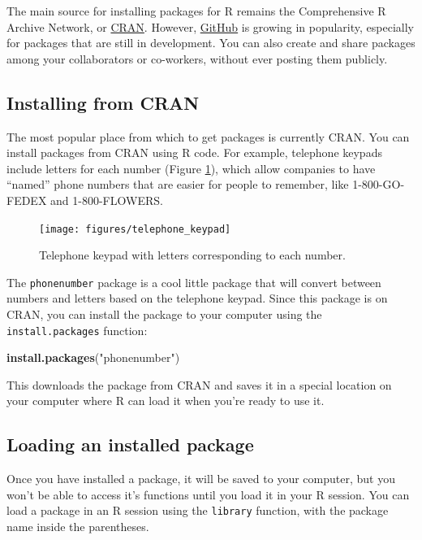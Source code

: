 \documentclass[]{book}
\makeatletter
\newenvironment{Shaded}{\begin{snugshade}}{\end{snugshade}}
\newcommand{\KeywordTok}[1]{\textcolor[rgb]{0.13,0.29,0.53}{\textbf{#1}}}
\newcommand{\StringTok}[1]{\textcolor[rgb]{0.31,0.60,0.02}{#1}}
\newcommand{\NormalTok}[1]{#1}
\newenvironment{kframe}{%
\medskip{}
\setlength{\fboxsep}{.8em}
 \def\at@end@of@kframe{}%
 \ifinner\ifhmode%
  \def\at@end@of@kframe{\end{minipage}}%
  \begin{minipage}{\columnwidth}%
 \fi\fi%
 \def\FrameCommand##1{\hskip\@totalleftmargin \hskip-\fboxsep
 \colorbox{shadecolor}{##1}\hskip-\fboxsep
     \hskip-\linewidth \hskip-\@totalleftmargin \hskip\columnwidth}%
 \MakeFramed {\advance\hsize-\width
   \@totalleftmargin\z@ \linewidth\hsize
   \@setminipage}}%
 {\par\unskip\endMakeFramed%
 \at@end@of@kframe}
\renewenvironment{Shaded}{\begin{kframe}}{\end{kframe}}
\theoremstyle{definition}
\theoremstyle{definition}
\theoremstyle{definition}
\theoremstyle{remark}
\makeatother
\begin{document}
The main source for installing packages for R remains the Comprehensive
R Archive Network, or \href{https://cran.r-project.org}{CRAN}. However,
\href{https://github.com}{GitHub} is growing in popularity, especially
for packages that are still in development. You can also create and
share packages among your collaborators or co-workers, without ever
posting them publicly.

\subsection{Installing from CRAN}\label{installing-from-cran}

The most popular place from which to get packages is currently CRAN. You
can install packages from CRAN using R code. For example, telephone
keypads include letters for each number (Figure \ref{fig:phone-keypad}),
which allow companies to have ``named'' phone numbers that are easier
for people to remember, like 1-800-GO-FEDEX and 1-800-FLOWERS.

\begin{figure}

{\centering \texttt{[image: figures/telephone\_keypad]} 

}

\caption{Telephone keypad with letters corresponding to each number.}\label{fig:phone-keypad}
\end{figure}

The \texttt{phonenumber} package is a cool little package that will
convert between numbers and letters based on the telephone keypad. Since
this package is on CRAN, you can install the package to your computer
using the \texttt{install.packages} function:

\begin{Shaded}
\begin{Highlighting}[]
\KeywordTok{install.packages}\NormalTok{(}\StringTok{"phonenumber"}\NormalTok{)}
\end{Highlighting}
\end{Shaded}

This downloads the package from CRAN and saves it in a special location
on your computer where R can load it when you're ready to use it.

\subsection{Loading an installed
package}\label{loading-an-installed-package}

Once you have installed a package, it will be saved to your computer,
but you won't be able to access it's functions until you load it in your
R session. You can load a package in an R session using the
\texttt{library} function, with the package name inside the parentheses.
\end{document}
